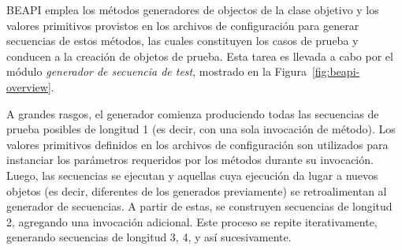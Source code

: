 



BEAPI emplea los métodos generadores de objectos de la clase objetivo 
y los valores primitivos provistos en los archivos de configuración para generar secuencias de estos métodos, 
las cuales constituyen los casos de prueba y conducen a la creación de objetos de prueba.
Esta tarea es llevada a cabo por el módulo \emph{generador de secuencia de test}, mostrado en la Figura~\ref{fig:beapi-overview}.

A grandes rasgos, el generador comienza produciendo todas las secuencias de prueba posibles de longitud 1 (es decir, con una sola invocación de método). 
Los valores primitivos definidos en los archivos de configuración son utilizados para instanciar los parámetros requeridos por los métodos durante su invocación.
Luego, las secuencias se ejecutan y aquellas cuya ejecución da lugar a nuevos objetos 
(es decir, diferentes de los generados previamente) se retroalimentan al generador de secuencias.
A partir de estas, se construyen secuencias de longitud 2, agregando una invocación adicional. 
Este proceso se repite iterativamente, generando secuencias de longitud 3, 4, y así sucesivamente.

